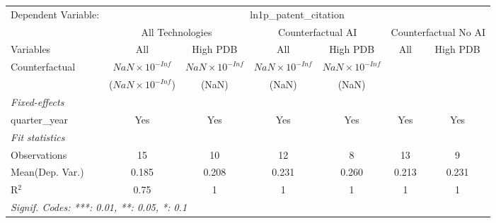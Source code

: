 \begingroup
\centering
\begin{tabular}{lcccccc}
   \tabularnewline \midrule \midrule
   Dependent Variable: & \multicolumn{6}{c}{ln1p\_patent\_citation}\\
 & \multicolumn{2}{c}{All Technologies} & \multicolumn{2}{c}{Counterfactual AI} & \multicolumn{2}{c}{Counterfactual No AI} \\
\cmidrule(lr){1-1}\cmidrule(lr){2-3} \cmidrule(lr){4-5} \cmidrule(lr){6-7}
Variables & \multicolumn{1}{c}{All} & \multicolumn{1}{c}{High PDB} & \multicolumn{1}{c}{All} & \multicolumn{1}{c}{High PDB} & \multicolumn{1}{c}{All} & \multicolumn{1}{c}{High PDB} \\
\cmidrule(lr){1-1}\cmidrule(lr){2-2} \cmidrule(lr){3-3} \cmidrule(lr){4-4} \cmidrule(lr){5-5} \cmidrule(lr){6-6} \cmidrule(lr){7-7}
   Counterfactual & $NaN\times 10^{-Inf}$    & $NaN\times 10^{-Inf}$  & $NaN\times 10^{-Inf}$  & $NaN\times 10^{-Inf}$  &     &   \\   
                  & ($NaN\times 10^{-Inf}$)  & (NaN)                  & (NaN)                  & (NaN)                  &     &   \\   
   \midrule
   \emph{Fixed-effects}\\
   quarter\_year  & Yes                      & Yes                    & Yes                    & Yes                    & Yes & Yes\\  
   \midrule
   \emph{Fit statistics}\\
   Observations   & 15                       & 10                     & 12                     & 8                      & 13  & 9\\  
Mean(Dep. Var.) & 0.185 & 0.208 & 0.231 & 0.260 & 0.213 & 0.231 \\
   R$^2$          & 0.75                     & 1                      & 1                      & 1                      & 1   & 1\\  
   \midrule \midrule
   \multicolumn{7}{l}{\emph{Signif. Codes: ***: 0.01, **: 0.05, *: 0.1}}\\
\end{tabular}
\par\endgroup
